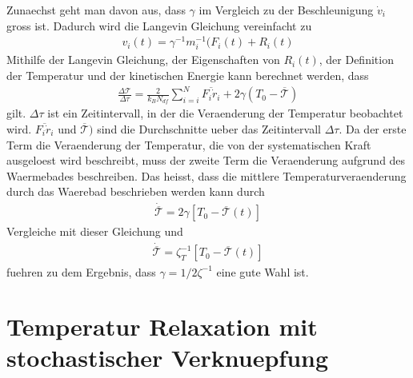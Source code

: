 \documentclass[]{article}
\begin{document}
Zunaechst geht man davon aus, dass $\gamma$ im Vergleich zu der Beschleunigung $\dot{v}_i$ gross ist. Dadurch wird die Langevin Gleichung vereinfacht zu 
\begin{align*}
	v_i(t) = \gamma^{-1} m_i^{-1} (F_i(t) + R_i(t)
\end{align*}
Mithilfe der Langevin Gleichung, der Eigenschaften von $R_i(t)$, der Definition der Temperatur und der kinetischen Energie kann berechnet werden, dass 
\begin{align*}
	\frac{\Delta \mathcal{T}}{\Delta \tau} = \frac{2}{k_B N_{df}} \sum\limits_{i=i}^N \overline{F_i \dot{r}_i} + 2 \gamma (T_0 - \overline{\mathcal{T}})  
\end{align*} 
gilt. $\Delta \tau$ ist ein Zeitintervall, in der die Veraenderung der Temperatur beobachtet wird. $\overline{F_i \dot{r}_i} $ und $\overline{\mathcal{T}})$ sind die Durchschnitte ueber das Zeitintervall $\Delta \tau$. Da der erste Term die Veraenderung der Temperatur, die von der systematischen Kraft ausgeloest wird beschreibt, muss der zweite Term die Veraenderung aufgrund des Waermebades beschreiben. 
Das heisst, dass die mittlere Temperaturveraenderung durch das Waerebad beschrieben werden kann durch
\begin{align*}
	\dot{ \overline{\mathcal{T}} } = 2 \gamma [T_0 - \overline{\mathcal{T}}(t)]  
\end{align*}
Vergleiche mit dieser Gleichung und 
\begin{align*}
 \dot{ \overline{\mathcal{T}} } = \zeta_T^{-1} [T_0 - \overline{\mathcal{T}}(t)] 
\end{align*}
fuehren zu dem Ergebnis, dass $\gamma = 1/2 \zeta^{-1}$ eine gute Wahl ist. 


\section{Temperatur Relaxation mit stochastischer Verknuepfung}
\end{document}
